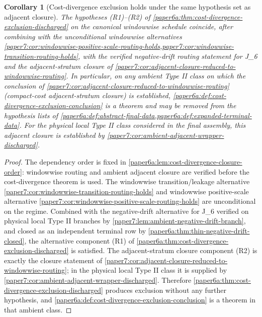 \documentclass[11pt]{amsart}
\def\({}%
\def\){}%
\theoremstyle{plain}
\newtheorem{corollary}[corollary]{Corollary}
\theoremstyle{definition}
\theoremstyle{remark}
\begin{document}
\begin{corollary}[Cost-divergence exclusion holds under the same hypothesis set as adjacent closure]
\label{paper6a:cor:cost-divergence-exclusion-unconditional}
The hypotheses \textup{(R1)}--\textup{(R2)} of
\cref{paper6a:thm:cost-divergence-exclusion-discharged} on the canonical
windowwise schedule coincide, after combining with the unconditional
windowwise alternatives
\cref{paper7:cor:windowwise-positive-scale-routing-holds,paper7:cor:windowwise-transition-routing-holds},
with the verified negative-drift routing statement for \(J_6\) and the
adjacent-stratum closure of
\cref{paper7:cor:adjacent-closure-reduced-to-windowwise-routing}.  In
particular, on any ambient Type II class on which the conclusion of
\cref{paper7:cor:adjacent-closure-reduced-to-windowwise-routing} (compact-cost
adjacent-stratum closure) is established,
\cref{paper6a:def:cost-divergence-exclusion-conclusion} is a theorem and may be removed
from the hypothesis lists of
\cref{paper6a:def:abstract-final-data,paper6a:def:expanded-terminal-data}.
For the physical local Type II class considered in the final assembly, this
adjacent closure is established by
\cref{paper7:cor:ambient-adjacent-wrapper-discharged}.
\end{corollary}

\begin{proof}
The dependency order is fixed in
\cref{paper6a:lem:cost-divergence-closure-order}: windowwise routing and
ambient adjacent closure are verified before the cost-divergence theorem is
used.
The windowwise transition/leakage alternative
\cref{paper7:cor:windowwise-transition-routing-holds} and windowwise
positive-scale alternative
\cref{paper7:cor:windowwise-positive-scale-routing-holds} are unconditional
on the regime.  Combined with the negative-drift alternative for \(J_6\)
verified on physical local Type II branches by
\cref{paper7:lem:ambient-negative-drift-branch}, and closed as an independent
terminal row by \cref{paper6a:thm:thin-negative-drift-closed},
the alternative component \textup{(R1)} of
\cref{paper6a:thm:cost-divergence-exclusion-discharged} is satisfied.
The adjacent-stratum closure component \textup{(R2)} is exactly the
closure statement of
\cref{paper7:cor:adjacent-closure-reduced-to-windowwise-routing}; in the
physical local Type II class it is supplied by
\cref{paper7:cor:ambient-adjacent-wrapper-discharged}.  Therefore
\cref{paper6a:thm:cost-divergence-exclusion-discharged} produces exclusion
without any further hypothesis, and
\cref{paper6a:def:cost-divergence-exclusion-conclusion} is a theorem in that ambient
class.
\end{proof}
\end{document}
